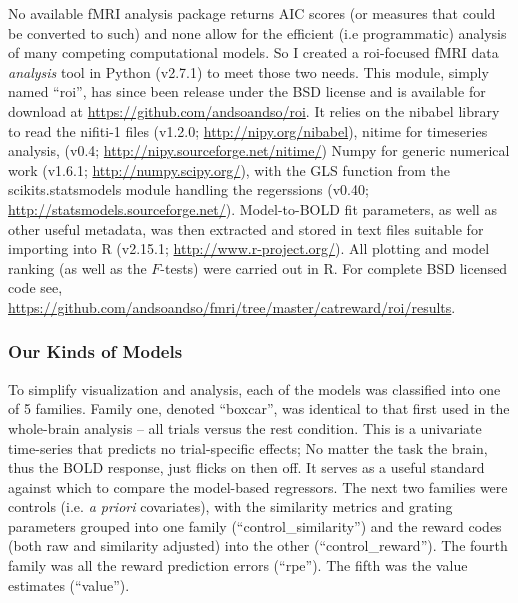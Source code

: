 \documentclass[doc,12pt]{apa}        %
\begin{document}
No available fMRI analysis package returns AIC scores (or measures that could be converted to such) and none allow for the efficient (i.e programmatic) analysis of many competing computational models. So I created a roi-focused fMRI data \emph{analysis} tool in Python (v2.7.1) to meet those two needs.  This module, simply named ``roi'', has since been release under the BSD license and is available for download at \url{https://github.com/andsoandso/roi}. It relies on the nibabel library to read the nifiti-1 files  (v1.2.0; \url{http://nipy.org/nibabel}), nitime for timeseries analysis, (v0.4; \url{http://nipy.sourceforge.net/nitime/}) Numpy for generic numerical work (v1.6.1; \url{http://numpy.scipy.org/}), with the GLS function from the scikits.statsmodels module handling the regerssions (v0.40; \url{http://statsmodels.sourceforge.net/}).  Model-to-BOLD fit parameters, as well as other useful metadata, was then extracted and stored in text files suitable for importing into R (v2.15.1; \url{http://www.r-project.org/}).  All plotting and model ranking (as well as the $F$-tests) were carried out in R.  For complete BSD licensed code see, \url{https://github.com/andsoandso/fmri/tree/master/catreward/roi/results}.

\subsubsection{Our Kinds of Models}
\label{subsub:ourkinds}
To simplify visualization and analysis, each of the models was classified into one of 5 families.  Family one, denoted ``boxcar'', was identical to that first used in the whole-brain analysis -- all trials versus the rest condition.  This is a univariate time-series that predicts no trial-specific effects; No matter the task the brain, thus the BOLD response, just flicks on then off.  It serves as a useful standard against which to compare the model-based regressors.  The next two families were controls (i.e. \emph{a priori} covariates), with the similarity metrics and grating parameters grouped into one family (``control\_similarity'') and the reward codes (both raw and similarity adjusted) into the other (``control\_reward'').  The fourth family was all the reward prediction errors (``rpe'').  The fifth was the value estimates (``value'').
\end{document}
